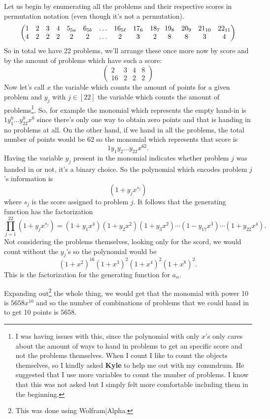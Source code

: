 \documentclass[12pt]{memoir}
\begin{document}
\begin{ptcbr}
Let us begin by enumerating all the problems and their respective scores in permutation notation (even though it's not a permutation).
$$
\left(
\begin{matrix}
    1&2&3&4&5_{5a}&6_{5b}&\dots&16_{5\ell}& 17_6 & 18_7 \\
    4&2&2&2&2&2&\dots&2& 3 & 2 
\end{matrix}\hspace{0.67em}
\begin{matrix}
    19_8&20_9&21_{10}&22_{11}\\
    8&8&3&4
\end{matrix}
\right)
$$
So in total we have 22 problems, we'll arrange these once more now by score and by the amount of problems which have such a score:
$$
\begin{pmatrix}
    2&3&4&8\\
    16&2&2&2
\end{pmatrix}
$$
Now let's call $x$ the variable which counts the amount of points for a given problem and $y_j$ with $j\in[22]$ the variable which counts the amount of problems\footnote{I was having issues with this, since the polynomial with only $x$'s only cares about the amount of ways to hand in problems to get an specific score and not the problems themselves. When I count I like to count the objects themselves, so I kindly asked \textbf{Kyle} to help me out with my conundrum. He suggested that I use more variables to count the number of problems. I know that this was not asked but I simply felt more comfortable including them in the beginning.}. So, for example the monomial which represents the empty hand-in is $1y_1^0\dots y_{22}^0x^0$ since there's only one way to obtain zero points and that is handing in no problems at all. On the other hand, if we hand in all the problems, the total number of points would be $62$ so the monomial which represents that score is 
$$1y_1y_2\dots y_{22}x^{62}.$$
Having the variable $y_j$ present in the monomial indicates whether problem $j$ was handed in or not, it's a binary choice. So the polynomial which encodes problem $j$'s information is 
$$(1+y_jx^{s_j})$$
where $s_j$ is the score assigned to problem $j$. It follows that the generating function has the factorization
$$\prod_{j=1}^{22}(1+y_jx^{s_j})=(1+y_1x^4)(1+y_2x^2)(1+y_3x^2)\cdots(1-y_{17}x^3)\cdots(1+y_{22}x^4).$$
Not considering the problems themselves, looking only for the scord, we would count without the $y_j$'s so the polynomial would be
$$(1+x^2)^{16}(1+x^3)^2(1+x^4)^2(1+x^8)^2.$$
This is the factorization for the generating function for $a_n$.\par 
Expanding out\footnote{This was done using Wolfram|Alpha.} the whole thing, we would get that the monomial with power 10 is $5658x^{10}$ and so the number of combinations of problems that we could hand in to get 10 points is $5658$.
\end{ptcbr}
\end{document}
